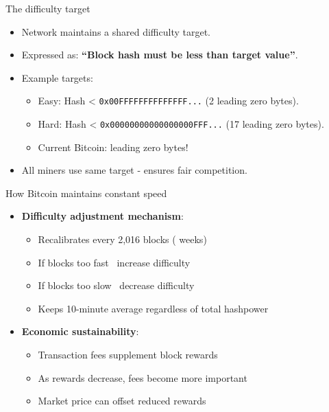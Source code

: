 \documentclass[aspectratio=169, lualatex, handout]{beamer}
\begin{document}
\begin{frame}{The difficulty target}
	\begin{itemize}
		\item Network maintains a shared difficulty target.
		\item Expressed as: \textbf{``Block hash must be less than target value''}.
		\item Example targets:
		      \begin{itemize}
			      \item Easy: Hash < \texttt{0x00FFFFFFFFFFFFFF...} (2 leading zero bytes).
			      \item Hard: Hash < \texttt{0x00000000000000000FFF...} (17 leading zero bytes).
			      \item Current Bitcoin:  leading zero bytes!
		      \end{itemize}
		\item All miners use same target - ensures fair competition.
	\end{itemize}
\end{frame}

\begin{frame}{How Bitcoin maintains constant speed}
	\begin{itemize}
		\item \textbf{Difficulty adjustment mechanism}:
		      \begin{itemize}
			      \item Recalibrates every 2,016 blocks ( weeks)
			      \item If blocks too fast \rightarrow\ increase difficulty
			      \item If blocks too slow \rightarrow\ decrease difficulty
			      \item Keeps 10-minute average regardless of total hashpower
		      \end{itemize}
		\item \textbf{Economic sustainability}:
		      \begin{itemize}
			      \item Transaction fees supplement block rewards
			      \item As rewards decrease, fees become more important
			      \item Market price can offset reduced rewards
		      \end{itemize}
	\end{itemize}
\end{frame}
\end{document}
